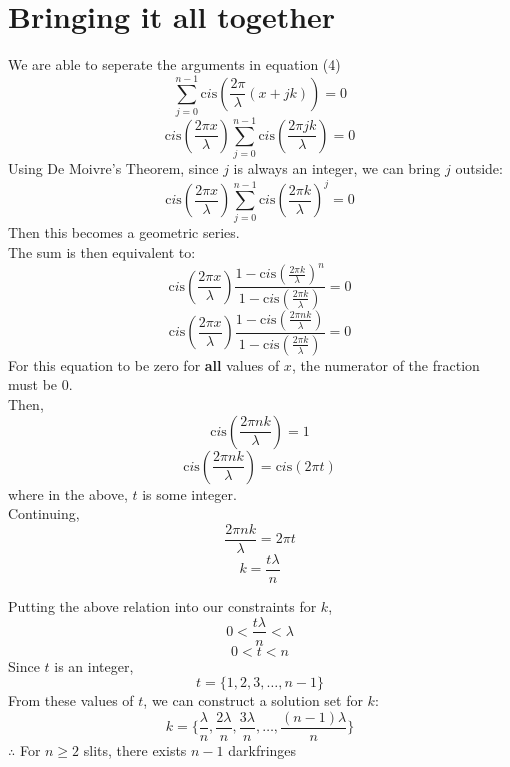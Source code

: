 \documentclass[12pt]{article}
\begin{document}
\section{Bringing it all together}
We are able to seperate the arguments in equation (4)
$$\sum_{j=0}^{n-1} \text{c}i\text{s}(\frac{2\pi}{\lambda}(x+jk))=0$$
$$\text{c}i\text{s}(\frac{2\pi x}{\lambda})\sum_{j=0}^{n-1}\text{c}i\text{s}(\frac{2\pi jk}{\lambda})=0$$
Using De Moivre's Theorem, since $j$ is always an integer, we can bring $j$ outside:
$$\text{c}i\text{s}(\frac{2\pi x}{\lambda})\sum_{j=0}^{n-1}\text{c}i\text{s}(\frac{2\pi k}{\lambda})^j=0$$
Then this becomes a geometric series.
\\The sum is then equivalent to: 
$$\text{c}i\text{s}(\frac{2\pi x}{\lambda})\frac{1-\text{c}i\text{s}(\frac{2\pi k}{\lambda})^n}{1-\text{c}i\text{s}(\frac{2\pi k}{\lambda})}=0$$
\begin{equation}
\text{c}i\text{s}(\frac{2\pi x}{\lambda})\frac{1-\text{c}i\text{s}(\frac{2\pi nk}{\lambda})}{1-\text{c}i\text{s}(\frac{2\pi k}{\lambda})}=0
\end{equation}
For this equation to be zero for \textbf{all} values of $x$, the numerator of the fraction must be 0.
\\Then,
$$\text{c}i\text{s}(\frac{2\pi nk}{\lambda})=1$$
$$\text{c}i\text{s}(\frac{2\pi nk}{\lambda})=\text{c}i\text{s}(2\pi t)$$
where in the above, $t$ is some integer. 
\\
\newpage
Continuing,
$$\frac{2\pi nk}{\lambda}=2\pi t$$
\begin{equation}
 k = \frac{t\lambda}{n} 
 \end{equation}

Putting the above relation into our constraints for $k$,
$$0<\frac{t\lambda}{n}<\lambda$$
$$0<t<n$$
Since $t$ is an integer, 
$$t = \{1,2,3,\ldots,n-1\}$$
From these values of $t$, we can construct a solution set for $k$:
$$k = \bigg\{\frac{\lambda}{n}, \frac{2\lambda}{n},\frac{3\lambda}{n}, \ldots, \frac{(n-1)\lambda}{n}\bigg\}$$
$\therefore$ For $n \geq 2$ slits, there exists $n-1$ darkfringes
\newpage
\end{document}

